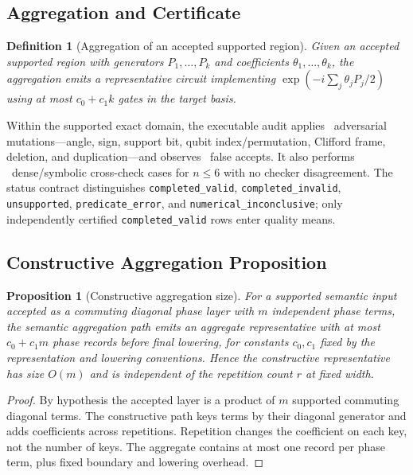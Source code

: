 \documentclass[aps,prx,reprint,floatfix,superscriptaddress]{revtex4-2}
\newtheorem{definition}{Definition}
\newtheorem{proposition}{Proposition}
\begin{document}
\subsection{Aggregation and Certificate}

\begin{definition}[Aggregation of an accepted supported region]
\label{def:aggregation}
Given an accepted supported region with generators $P_1,\ldots,P_k$ and coefficients
$\theta_1,\ldots,\theta_k$, the aggregation emits a representative
circuit implementing $\exp(-i\sum_j \theta_j P_j / 2)$ using at most
$c_0 + c_1 k$ gates in the target basis.
\end{definition}



Within the supported exact domain, the executable audit applies
\CertificateMutationCases\ adversarial mutations---angle, sign, support bit,
qubit index/permutation, Clifford frame, deletion, and duplication---and
observes \CertificateFalseAccepts\ false accepts.  It also performs
\CertificateCrosscheckCases\ dense/symbolic cross-check cases for $n\leq6$
with no checker disagreement.  The status contract distinguishes
\texttt{completed\_valid}, \texttt{completed\_invalid},
\texttt{unsupported}, \texttt{predicate\_error}, and
\texttt{numerical\_inconclusive}; only independently certified
\texttt{completed\_valid} rows enter quality means.

\subsection{Constructive Aggregation Proposition}

\begin{proposition}[Constructive aggregation size]
\label{prop:constructive-aggregation}
For a supported semantic input accepted as a commuting diagonal phase layer
with $m$ independent phase terms, the semantic aggregation path emits an aggregate representative with at
most $c_0 + c_1 m$ phase records before final lowering, for constants
$c_0, c_1$ fixed by the representation and lowering conventions. Hence
the constructive representative has size $O(m)$ and is independent of the
repetition count $r$ at fixed width.
\end{proposition}

\begin{proof}
By hypothesis the accepted layer is a product of $m$ supported commuting
diagonal terms. The constructive
path keys terms by their diagonal generator and adds coefficients across
repetitions. Repetition changes the coefficient on each key, not the
number of keys. The aggregate contains at most one record per phase term,
plus fixed boundary and lowering overhead.
\end{proof}
\end{document}
